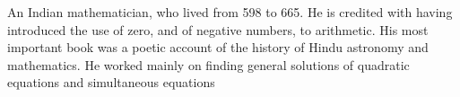 An Indian mathematician, who lived from 598 to 665. He is credited with having introduced
the use of zero, and of negative numbers, to arithmetic. His most
important book was a poetic account of the history of Hindu
astronomy and mathematics. He worked mainly on finding general
solutions of quadratic equations and simultaneous equations